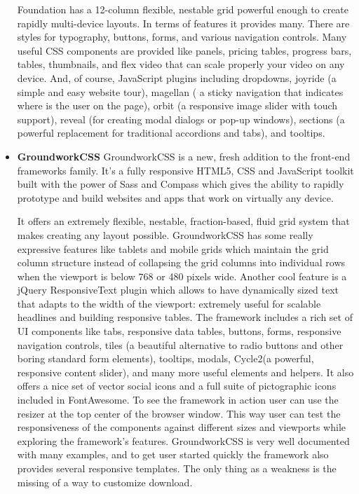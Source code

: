 \begin{itemize}
Foundation has a 12-column flexible, nestable grid powerful enough to create rapidly multi-device layouts. In terms of features it provides many. There are styles for typography, buttons, forms, and various navigation controls. Many useful CSS components are provided like panels, pricing tables, progress bars, tables, thumbnails, and flex video that can scale properly your video on any device. And, of course, JavaScript plugins including dropdowns, joyride (a simple and easy website tour), magellan ( a sticky navigation that indicates where is the user on the page), orbit (a responsive image slider with touch support), reveal (for creating modal dialogs or pop-up windows),  sections (a powerful replacement for traditional accordions and tabs), and tooltips.
\item \textbf{GroundworkCSS}
\newline
GroundworkCSS is a new, fresh addition to the front-end frameworks family. It’s a fully responsive HTML5, CSS and JavaScript toolkit built with the power of Sass and Compass which gives the ability to rapidly prototype and build websites and apps that work on virtually any device.

It offers an extremely flexible, nestable, fraction-based, fluid grid system that makes creating any layout possible. GroundworkCSS has some really expressive features like tablets and mobile grids which maintain the grid column structure instead of collapsing the grid columns into individual rows when the viewport is below 768 or 480 pixels wide. Another cool feature is a jQuery ResponsiveText plugin which allows to have dynamically sized text that adapts to the width of the viewport: extremely useful for scalable headlines and building responsive tables.
The framework includes a rich set of UI components like tabs, responsive data tables, buttons, forms, responsive navigation controls, tiles (a beautiful alternative to radio buttons and other boring standard form elements), tooltips, modals, Cycle2(a powerful, responsive content slider), and many more useful elements and helpers. It also offers a nice set of vector social icons and a full suite of pictographic icons included in FontAwesome.
To see the framework in action user can use the resizer at the top center of the browser window. This way user can test the responsiveness of the components against different sizes and viewports while exploring the framework’s features.
GroundworkCSS is very well documented with many examples, and to get user started quickly the framework also provides several responsive templates. The only thing as a weakness is the missing of a way to customize download.


\end{itemize}

